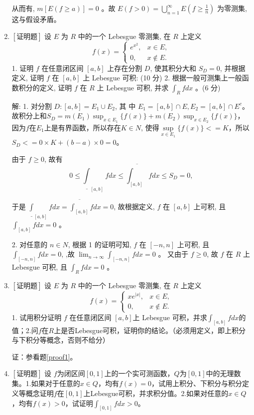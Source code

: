 \documentclass{article}
\begin{document}
\begin{enumerate}
从而有, $m[E(f \geq a)]=0$ 。故 $E(f>0)=\bigcup_{n=1}^{\infty} E\left(f \geq \frac{1}{n}\right)$ 为零测集, 这与假设矛盾。

\item $\left[\textbf{证明题}\right]$ 设 $E$ 为 $R$ 中的一个 Lebesgue 零测集, 在 $R$ 上定义
$$
f(x)=\left\{\begin{array}{cc}
e^{x^2}, & x \in E, \\
0, & x \notin E .
\end{array}\right.
$$
1. 证明 $f$ 在任意闭区间 $[a, b]$ 上存在分割 $D$, 使其积分大和 $S_D=0$, 并根据定义, 证明 $f$ 在 $[a, b]$ 上 Lebesgue 可积: (10 分) 2. 根据一般可测集上一般函数积分的定义, 证明 $f$ 在 $R$ 上 Lebesgue 可积, 并求 $\int_R f d x$ 。(6 分)

解:
1. 对分割 $D:[a, b]=E_1 \cup E_2$, 其 中 $E_1=[a, b] \cap E, E_2=[a, b] \cap E^c$。故积分上和$S_D=m(E_1)\sup_{x\in E_1} \{f(x)\} + m(E_2)\sup_{x\in E_2} \{f(x)\}$，因为$f$在$E_1$上是有界函数，所以存在$K \in N$, 使得$\mathop{sup}\limits_{x\in E_1} \{f(x)\} <= K$，所以$S_D <= 0\times K + (b - a)\times 0 = 0$。

由于 $f \geq 0$, 故有
$$
0 \leq \underline{\int}_{[a, b]} f d x \leq \overline{\int_{[a, b]}} f d x \leq S_D=0,
$$

于是 $\underline{\int}_{[a, b]} f d x=\overline{\int_{[a, b]}} f d x=0$, 故根据定义, $f$ 在 $[a, b]$ 上可积, 且 $\int_{[a, b]} f d x=0$ 。

2. 对任意的 $n \in N$, 根据 1 的证明可知, $f$ 在 $[-n, n]$ 上可积, 且 $\int_{[-n, n]} f d x=0$, ,故 $\lim _{n \rightarrow \infty} \int_{[-n, n]} f d x=0$ 。 又由于 $f \geq 0$, 故 $f$ 在 $R$ 上 Lebesgue 可积, 且 $\int_R f d x=0$ 。

\item $\left[\textbf{证明题}\right]$ 设 $E$ 为 $R$ 中的一个 Lebesgue 零测集, 在 $R$ 上定义
$$
f(x)=\left\{\begin{array}{cc}
xe^{|x|}, & x \in E, \\
0, & x \notin E .
\end{array}\right.
$$
1. 试用积分证明 $f$ 在任意闭区间 $[a, b]$上 Lebesgue 可积，并求$\int_{[a, b]}fdx$的值；2.问$f$在$R$上是否Lebesgue可积，证明你的结论。（必须用定义，即上积分与下积分等概念，否则不给分）

证：参看题\ref{proof1}。

\item $\left[\textbf{证明题}\right]$ 设 $f$为闭区间$[0, 1]$上的一个实可测函数，$Q$为$[0, 1]$中的无理数集。1.如果对于任意的$x\in Q$，均有$f(x)=0$，试用上积分、下积分与积分定义等概念证明$f$在$[0, 1]$上Lebesgue可积，并求积分值。2.如果对任意的$x\in Q$，均有$f(x) > 0$，试证明$\int_{[0, 1]}f dx > 0$。


\end{enumerate}
\end{document}
